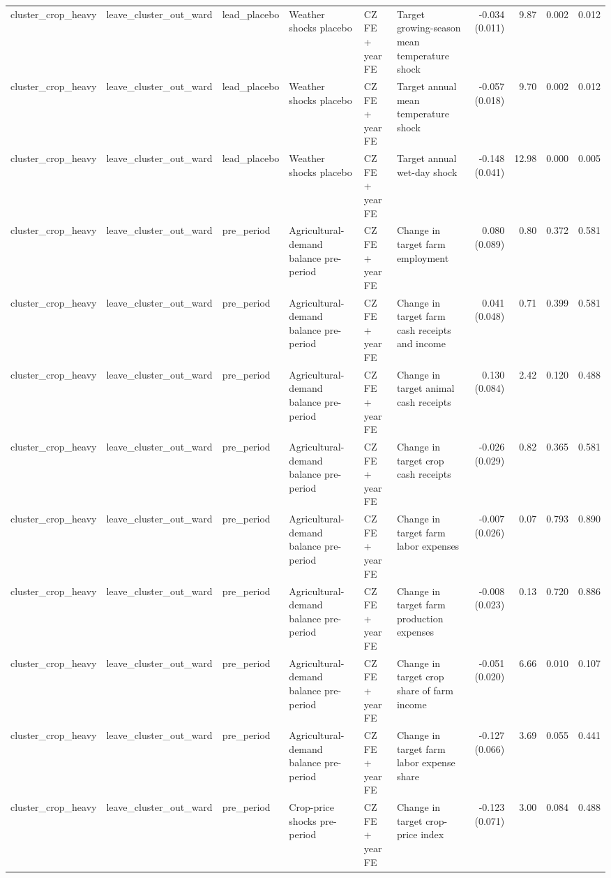 \begin{tabular}{llllllrrrr}
cluster_crop_heavy & leave_cluster_out_ward & lead_placebo & Weather shocks placebo & CZ FE + year FE & Target growing-season mean temperature shock & -0.034 (0.011) & 9.87 & 0.002 & 0.012 \\
cluster_crop_heavy & leave_cluster_out_ward & lead_placebo & Weather shocks placebo & CZ FE + year FE & Target annual mean temperature shock & -0.057 (0.018) & 9.70 & 0.002 & 0.012 \\
cluster_crop_heavy & leave_cluster_out_ward & lead_placebo & Weather shocks placebo & CZ FE + year FE & Target annual wet-day shock & -0.148 (0.041) & 12.98 & 0.000 & 0.005 \\
cluster_crop_heavy & leave_cluster_out_ward & pre_period & Agricultural-demand balance pre-period & CZ FE + year FE & Change in target farm employment & 0.080 (0.089) & 0.80 & 0.372 & 0.581 \\
cluster_crop_heavy & leave_cluster_out_ward & pre_period & Agricultural-demand balance pre-period & CZ FE + year FE & Change in target farm cash receipts and income & 0.041 (0.048) & 0.71 & 0.399 & 0.581 \\
cluster_crop_heavy & leave_cluster_out_ward & pre_period & Agricultural-demand balance pre-period & CZ FE + year FE & Change in target animal cash receipts & 0.130 (0.084) & 2.42 & 0.120 & 0.488 \\
cluster_crop_heavy & leave_cluster_out_ward & pre_period & Agricultural-demand balance pre-period & CZ FE + year FE & Change in target crop cash receipts & -0.026 (0.029) & 0.82 & 0.365 & 0.581 \\
cluster_crop_heavy & leave_cluster_out_ward & pre_period & Agricultural-demand balance pre-period & CZ FE + year FE & Change in target farm labor expenses & -0.007 (0.026) & 0.07 & 0.793 & 0.890 \\
cluster_crop_heavy & leave_cluster_out_ward & pre_period & Agricultural-demand balance pre-period & CZ FE + year FE & Change in target farm production expenses & -0.008 (0.023) & 0.13 & 0.720 & 0.886 \\
cluster_crop_heavy & leave_cluster_out_ward & pre_period & Agricultural-demand balance pre-period & CZ FE + year FE & Change in target crop share of farm income & -0.051 (0.020) & 6.66 & 0.010 & 0.107 \\
cluster_crop_heavy & leave_cluster_out_ward & pre_period & Agricultural-demand balance pre-period & CZ FE + year FE & Change in target farm labor expense share & -0.127 (0.066) & 3.69 & 0.055 & 0.441 \\
cluster_crop_heavy & leave_cluster_out_ward & pre_period & Crop-price shocks pre-period & CZ FE + year FE & Change in target crop-price index & -0.123 (0.071) & 3.00 & 0.084 & 0.488 \\

\end{tabular}

